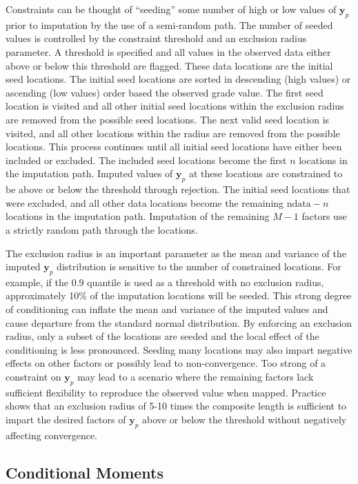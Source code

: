 Constraints can be thought of ``seeding'' some number of high or low values of $\mathbf{y}_{p}$ prior to imputation by the use of a semi-random path. The number of seeded values is controlled by the constraint threshold and an exclusion radius parameter. A threshold is specified and all values in the observed data either above or below this threshold are flagged. These data locations are the initial seed locations. The initial seed locations are sorted in descending (high values) or ascending (low values) order based the observed grade value. The first seed location is visited and all other initial seed locations within the exclusion radius are removed from the possible seed locations. The next valid seed location is visited, and all other locations within the radius are removed from the possible locations. This process continues until all initial seed locations have either been included or excluded. The included seed locations become the first $n$ locations in the imputation path. Imputed values of $\mathbf{y}_{p}$ at these locations are constrained to be above or below the threshold through rejection. The initial seed locations that were excluded, and all other data locations become the remaining $\text{ndata} - n$ locations in the imputation path. Imputation of the remaining $M-1$ factors use a strictly random path through the locations.

The exclusion radius is an important parameter as the mean and variance of the imputed $\mathbf{y}_{p}$ distribution is sensitive to the number of constrained locations. For example, if the 0.9 quantile is used as a threshold with no exclusion radius, approximately 10\% of the imputation locations will be seeded. This strong degree of conditioning can inflate the mean and variance of the imputed values and cause departure from the standard normal distribution. By enforcing an exclusion radius, only a subset of the locations are seeded and the local effect of the conditioning is less pronounced. Seeding many locations may also impart negative effects on other factors or possibly lead to non-convergence. Too strong of a constraint on $\mathbf{y}_{p}$ may lead to a scenario where the remaining factors lack sufficient flexibility to reproduce the observed value when mapped. Practice shows that an exclusion radius of 5-10 times the composite length is sufficient to impart the desired factors of $\mathbf{y}_{p}$ above or below the threshold without negatively affecting convergence.

\subsection{Conditional Moments}
\label{subsec:condmom}

